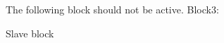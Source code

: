 %
%

The following block should not be active.
Block3:\medbreak
\begin{iteblock}
\ite Slave block
\end{iteblock}
